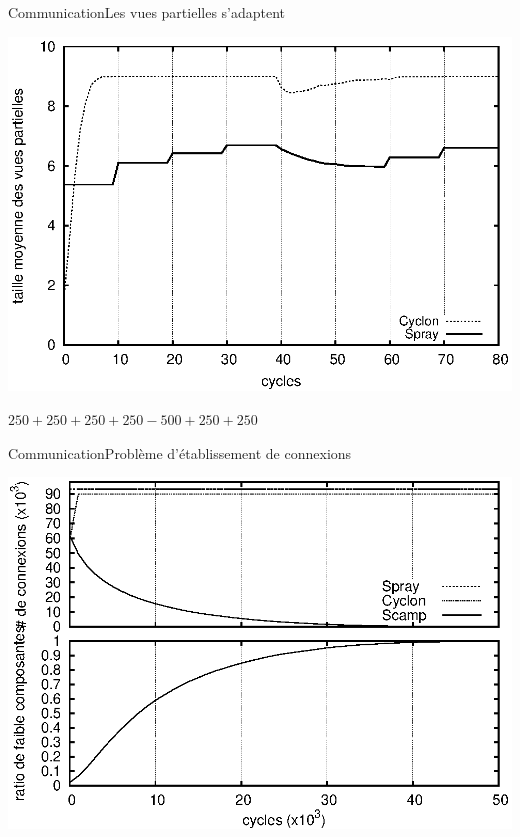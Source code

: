 \begin{frame}{Communication}{Les vues partielles s'adaptent}
  \begin{center}
    \includegraphics[width=1\textwidth]{img/network/avgpv.eps}
  \end{center}
  \begin{center}
    $250+250+250+250-500+250+250$
  \end{center}
\end{frame}

\begin{frame}{Communication}{Problème d'établissement de connexions}

  \begin{center}
    \includegraphics[width=1\textwidth]{img/network/degen.eps}
  \end{center}

\end{frame}

